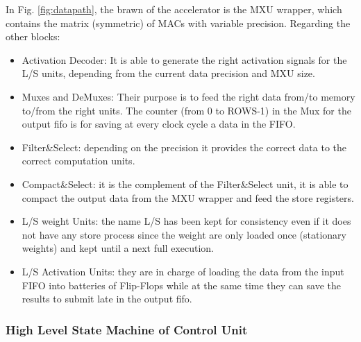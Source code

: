 In Fig. \ref{fig:datapath}, the brawn of the accelerator is the MXU wrapper, which contains the matrix (symmetric) of MACs with variable precision. Regarding the other blocks:
\begin{itemize}
\item Activation Decoder: It is able to generate the right activation signals for the L/S units, depending from the current data precision and MXU size.
\item Muxes and DeMuxes: Their purpose is to feed the right data from/to memory to/from the right units. The counter (from 0 to ROWS-1) in the Mux for the output fifo is for saving at every clock cycle a data in the FIFO.
\item Filter\&Select: depending on the precision it provides the correct data to the correct computation units.
\item Compact\&Select: it is the complement of the Filter\&Select unit, it is able to compact the output data from the MXU wrapper and feed the store registers.
\item L/S weight Units: the name L/S has been kept for consistency even if it does not have any store process since the weight are only loaded once (stationary weights) and kept until a next full execution. 
\item L/S Activation Units:  they are in charge of loading the data from the input FIFO into batteries of Flip-Flops while at the same time they can save the results to submit late in the output fifo.
\end{itemize}

\subsubsection{High Level State Machine of Control Unit}


